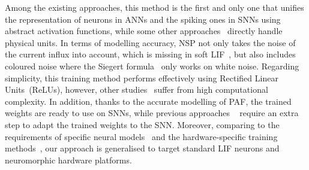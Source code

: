 

Among the existing approaches, this method is the first and only one that unifies the representation of neurons in ANNs and the spiking ones in SNNs using abstract activation functions, while some other approaches~\citep{Jug_etal_2012,hunsberger2015spiking} directly handle physical units.
In terms of modelling accuracy, NSP not only takes the noise of the current influx into account, which is missing in soft LIF~\citep{hunsberger2015spiking}, but also includes coloured noise where the Siegert formula~\citep{Jug_etal_2012} only works on white noise.
Regarding simplicity, this training method performs effectively using Rectified Linear Units~(ReLUs), however, other studies~\citep{Jug_etal_2012,hunsberger2015spiking} suffer from high computational complexity.
In addition, thanks to the accurate modelling of PAF, the trained weights are ready to use on SNNs, while previous approaches ~\citep{cao2015spiking,diehl2015fast} require an extra step to adapt the trained weights to the SNN.
Moreover, comparing to the requirements of specific neural models~\citep{cao2015spiking,diehl2015fast} and the hardware-specific training methods~\citep{diehl2016conversion,diehl2016truehappiness,esser2015backpropagation}, our approach is generalised to target standard LIF neurons and neuromorphic hardware platforms.

